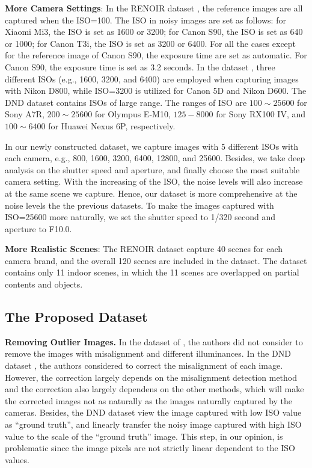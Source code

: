 \textbf{More Camera Settings}: In the RENOIR dataset \cite{RENOIR2014}, the reference images are all captured when the ISO=100. The ISO in noisy images are set as follows:  for Xiaomi Mi3, the ISO is set as 1600 or 3200; for Canon S90, the ISO is set as 640 or 1000; for Canon T3i, the ISO is set as 3200 or 6400. For all the cases except for the reference image of Canon S90, the exposure time are set as automatic. For Canon S90, the exposure time is set as 3.2 seconds. In the dataset \cite{crosschannel2016}, three different ISOs (e.g., 1600, 3200, and 6400) are employed when capturing images with Nikon D800, while ISO=3200 is utilized for Canon 5D and Nikon D600. The DND dataset \cite{dnd2017} contains ISOs of large range. The ranges of ISO are $100\sim25600$ for Sony A7R, $200\sim25600$ for Olympus E-M10, $125-8000$ for Sony RX100 IV, and $100\sim6400$ for Huawei Nexus 6P, respectively. 

In our newly constructed dataset, we capture images with 5 different ISOs with each camera, e.g., 800, 1600, 3200, 6400, 12800, and 25600. Besides, we take deep analysis on the shutter speed and aperture, and finally choose the most suitable camera setting. With the increasing of the ISO, the noise levels will also increase at the same scene we capture. Hence, our dataset is more comprehensive at the noise levels the the previous datasets. To make the images captured with ISO=25600 more naturally, we set the shutter speed to 1/320 second and aperture to F10.0. 

\textbf{More Realistic Scenes}: The RENOIR dataset \cite{RENOIR2014} capture 40 scenes for each camera brand, and the overall 120 scenes are included in the dataset.  The dataset \cite{crosschannel2016} contains only 11 indoor scenes, in which the 11 scenes are overlapped on partial contents and objects. 



\subsection{The Proposed Dataset}


\textbf{Removing Outlier Images.} In the dataset of \cite{crosschannel2016}, the authors did not consider to remove the images with misalignment and different illuminances. In the DND dataset \cite{dnd2017}, the authors considered to correct the misalignment of each image. However, the correction largely depends on the misalignment detection method and the correction also largely dependens on the other methods, which will make the corrected images not as naturally as the images naturally captured by the cameras. Besides, the DND dataset \cite{dnd2017} view the image captured with low ISO value as ``ground truth'', and linearly transfer the noisy image captured with high ISO value to the scale of the ``ground truth'' image. This step, in our opinion, is problematic since the image pixels are not strictly linear dependent to the ISO values. 

